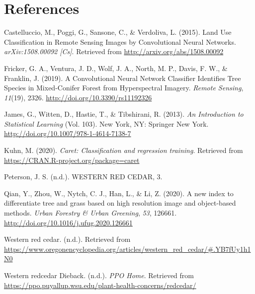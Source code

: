 \documentclass[12pt,twoside]{reedthesis}
\begin{document}
\backmatter

\hypertarget{references}{%
\chapter*{References}\label{references}}


\noindent

\setlength{\parindent}{-0.20in}
\setlength{\leftskip}{0.20in}
\setlength{\parskip}{8pt}

\hypertarget{refs}{}
\leavevmode\hypertarget{ref-castelluccio_land_2015}{}%
Castelluccio, M., Poggi, G., Sansone, C., \& Verdoliva, L. (2015). Land Use Classification in Remote Sensing Images by Convolutional Neural Networks. \emph{arXiv:1508.00092 {[}Cs{]}}. Retrieved from \url{http://arxiv.org/abs/1508.00092}

\leavevmode\hypertarget{ref-fricker_convolutional_2019}{}%
Fricker, G. A., Ventura, J. D., Wolf, J. A., North, M. P., Davis, F. W., \& Franklin, J. (2019). A Convolutional Neural Network Classifier Identifies Tree Species in Mixed-Conifer Forest from Hyperspectral Imagery. \emph{Remote Sensing}, \emph{11}(19), 2326. \url{http://doi.org/10.3390/rs11192326}

\leavevmode\hypertarget{ref-james_introduction_2013}{}%
James, G., Witten, D., Hastie, T., \& Tibshirani, R. (2013). \emph{An Introduction to Statistical Learning} (Vol. 103). New York, NY: Springer New York. \url{http://doi.org/10.1007/978-1-4614-7138-7}

\leavevmode\hypertarget{ref-caret}{}%
Kuhn, M. (2020). \emph{Caret: Classification and regression training}. Retrieved from \url{https://CRAN.R-project.org/package=caret}

\leavevmode\hypertarget{ref-peterson_western_nodate}{}%
Peterson, J. S. (n.d.). WESTERN RED CEDAR, 3.

\leavevmode\hypertarget{ref-qian_new_2020}{}%
Qian, Y., Zhou, W., Nytch, C. J., Han, L., \& Li, Z. (2020). A new index to differentiate tree and grass based on high resolution image and object-based methods. \emph{Urban Forestry \& Urban Greening}, \emph{53}, 126661. \url{http://doi.org/10.1016/j.ufug.2020.126661}

\leavevmode\hypertarget{ref-noauthor_western_nodate-1}{}%
Western red cedar. (n.d.). Retrieved from \url{https://www.oregonencyclopedia.org/articles/western_red_cedar/\#.YB7fUy1h1N0}

\leavevmode\hypertarget{ref-noauthor_western_nodate}{}%
Western redcedar Dieback. (n.d.). \emph{PPO Home}. Retrieved from \url{https://ppo.puyallup.wsu.edu/plant-health-concerns/redcedar/}


\end{document}
